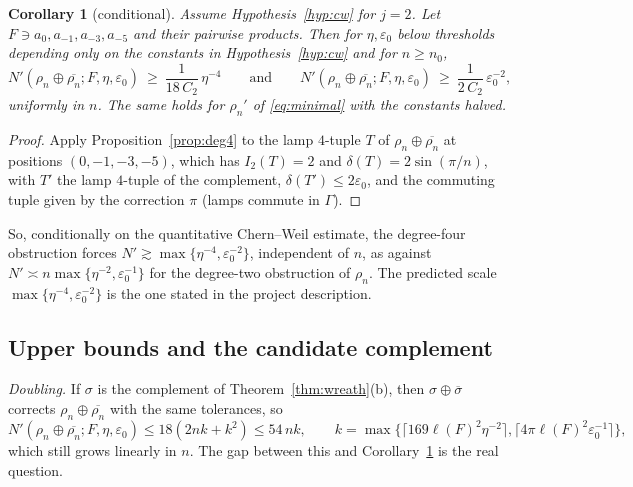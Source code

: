 \documentclass[11pt]{amsart}
\newtheorem{corollary}[theorem]{Corollary}
\theoremstyle{definition}
\theoremstyle{remark}
\newcommand{\lamp}{a}
\begin{document}
\begin{corollary}[conditional]\label{cor:deg4}
Assume Hypothesis~\ref{hyp:cw} for $j=2$. Let $F\ni\lamp_0,\lamp_{-1},\lamp_{-3},\lamp_{-5}$ and their pairwise products. Then for $\eta,\varepsilon_0$ below thresholds depending only on the constants in Hypothesis~\ref{hyp:cw} and for $n\ge n_0$,
\[
N'(\rho_n\oplus\overline{\rho_n};F,\eta,\varepsilon_0)\ \ge\ \frac{1}{18\,C_2}\,\eta^{-4}\qquad\text{and}\qquad N'(\rho_n\oplus\overline{\rho_n};F,\eta,\varepsilon_0)\ \ge\ \frac{1}{2\,C_2}\,\varepsilon_0^{-2},
\]
\emph{uniformly in $n$}. The same holds for $\rho_n'$ of \eqref{eq:minimal} with the constants halved.
\end{corollary}

\begin{proof}
Apply Proposition~\ref{prop:deg4} to the lamp $4$-tuple $T$ of $\rho_n\oplus\overline{\rho_n}$ at positions $(0,-1,-3,-5)$, which has $I_2(T)=2$ and $\delta(T)=2\sin(\pi/n)$, with $T'$ the lamp $4$-tuple of the complement, $\delta(T')\le2\varepsilon_0$, and the commuting tuple given by the correction $\pi$ (lamps commute in $\Gamma$).
\end{proof}

So, conditionally on the quantitative Chern--Weil estimate, the degree-four obstruction forces $N'\gtrsim\max\{\eta^{-4},\varepsilon_0^{-2}\}$, independent of $n$, as against $N'\asymp n\max\{\eta^{-2},\varepsilon_0^{-1}\}$ for the degree-two obstruction of $\rho_n$. The predicted scale $\max\{\eta^{-4},\varepsilon_0^{-2}\}$ is the one stated in the project description.

\subsection{Upper bounds and the candidate complement}\label{sec:candidate}

\emph{Doubling.} If $\sigma$ is the complement of Theorem~\ref{thm:wreath}(b), then $\sigma\oplus\overline\sigma$ corrects $\rho_n\oplus\overline{\rho_n}$ with the same tolerances, so
\[
N'(\rho_n\oplus\overline{\rho_n};F,\eta,\varepsilon_0)\le18(2nk+k^2)\le54\,nk,\qquad k=\max\{\lceil169\ell(F)^2\eta^{-2}\rceil,\lceil4\pi\ell(F)^2\varepsilon_0^{-1}\rceil\},
\]
which still grows linearly in $n$. The gap between this and Corollary~\ref{cor:deg4} is the real question.
\end{document}
